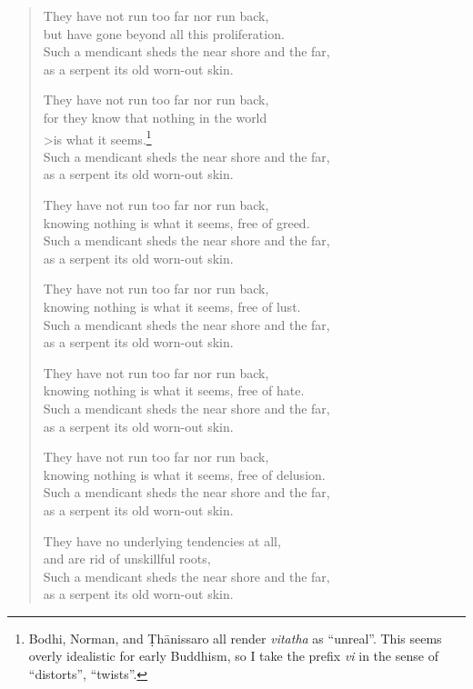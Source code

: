 \documentclass[12pt,openany]{book}%
\begin{document}
\begin{verse}
They have not run too far nor run back, \\
but have gone beyond all this proliferation. \\
Such a mendicant sheds the near shore and the far, \\
as a serpent its old worn-out skin. 

They have not run too far nor run back, \\
for they know that nothing in the world \\>is what it seems.\footnote{Bodhi, Norman, and \textsanskrit{Ṭhānissaro} all render \textit{vitatha} as “unreal”. This seems overly idealistic for early Buddhism, so I take the prefix \textit{vi} in the sense of “distorts”, “twists”. } \\
Such a mendicant sheds the near shore and the far, \\
as a serpent its old worn-out skin. 

They have not run too far nor run back, \\
knowing nothing is what it seems, free of greed. \\
Such a mendicant sheds the near shore and the far, \\
as a serpent its old worn-out skin. 

They have not run too far nor run back, \\
knowing nothing is what it seems, free of lust. \\
Such a mendicant sheds the near shore and the far, \\
as a serpent its old worn-out skin. 

They have not run too far nor run back, \\
knowing nothing is what it seems, free of hate. \\
Such a mendicant sheds the near shore and the far, \\
as a serpent its old worn-out skin. 

They have not run too far nor run back, \\
knowing nothing is what it seems, free of delusion. \\
Such a mendicant sheds the near shore and the far, \\
as a serpent its old worn-out skin. 

They have no underlying tendencies at all, \\
and are rid of unskillful roots, \\
Such a mendicant sheds the near shore and the far, \\
as a serpent its old worn-out skin. 


\end{verse}
\end{document}
